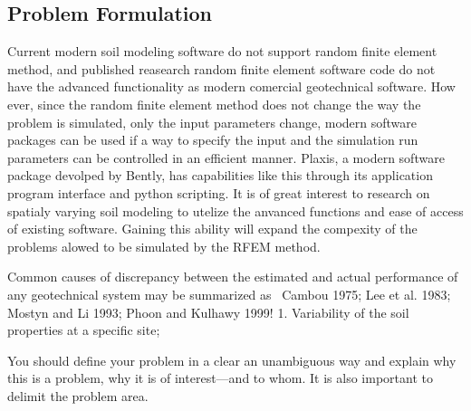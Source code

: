 \subsection*{Problem Formulation}
Current modern soil modeling software do not support random finite element method, and published reasearch random finite element software code do not have the advanced functionality as modern comercial geotechnical software.
How ever, since the random finite element method does not change the way the problem is simulated, only the input parameters change, modern software packages can be used if a way to specify the input and the simulation run parameters can be controlled in an efficient manner.
Plaxis, a modern software package devolped by Bently, has capabilities like this through its application program interface and python scripting. 
It is of great interest to research on spatialy varying soil modeling to utelize the anvanced functions and ease of access of existing software. Gaining this ability will expand the compexity of the problems alowed to be simulated by the RFEM method.

Common causes of discrepancy between the estimated and  actual performance of any geotechnical system may be summarized as ~Cambou 1975; Lee et al. 1983; Mostyn and Li 1993;  Phoon and Kulhawy 1999!  1. Variability of the soil properties at a specific site;


You should define your problem in a clear an unambiguous way and explain why this is a problem, why it is of interest---and to whom. It is also important to delimit the problem area.

